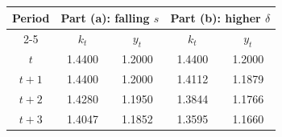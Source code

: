 \documentclass[12pt]{article}
\begin{document}
\begin{center}
\renewcommand{\arraystretch}{1.25}
\begin{tabular}{|c|c|c|c|c|}
\hline
Period & \multicolumn{2}{c|}{Part (a): falling \(s\)} & \multicolumn{2}{c|}{Part (b): higher \(\delta\)} \\
\cline{2-5}
& \(k_t\) & \(y_t\) & \(k_t\) & \(y_t\) \\
\hline
\(t\)   & 1.4400 & 1.2000 & 1.4400 & 1.2000 \\
\(t+1\) & 1.4400 & 1.2000 & 1.4112 & 1.1879 \\
\(t+2\) & 1.4280 & 1.1950 & 1.3844 & 1.1766 \\
\(t+3\) & 1.4047 & 1.1852 & 1.3595 & 1.1660 \\
\hline
\end{tabular}
\end{center}
\end{document}
